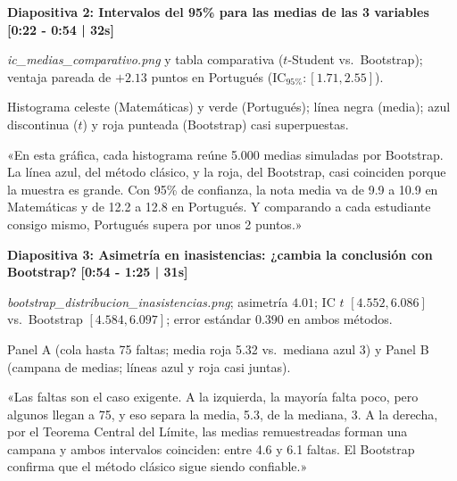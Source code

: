 \documentclass[11pt,a4paper]{article}
\begin{document}
\vspace{0.35cm}

\noindent
\textbf{\large Diapositiva 2: Intervalos del 95\% para las medias de las 3 variables} \hfill \textcolor{timeRed}{\textbf{[0:22 - 0:54 | 32s]}}
\begin{description}[noitemsep,topsep=2pt]
  \item[Visual en Pantalla:] \textit{ic\_medias\_comparativo.png} y tabla comparativa ($t$-Student vs.\ Bootstrap); ventaja pareada de $+2.13$ puntos en Portugués ($\text{IC}_{95\%}: [1.71, 2.55]$).
  \item[Señalar:] Histograma celeste (Matemáticas) y verde (Portugués); línea negra (media); azul discontinua ($t$) y roja punteada (Bootstrap) casi superpuestas.
  \item[Guion de Voz (63 palabras):]
    «En esta gráfica, cada histograma reúne 5.000 medias simuladas por Bootstrap. La línea azul, del método clásico, y la roja, del Bootstrap, casi coinciden porque la muestra es grande. Con 95\% de confianza, la nota media va de 9.9 a 10.9 en Matemáticas y de 12.2 a 12.8 en Portugués. Y comparando a cada estudiante consigo mismo, Portugués supera por unos 2 puntos.»
\end{description}

\vspace{0.35cm}

\noindent
\textbf{\large Diapositiva 3: Asimetría en inasistencias: ¿cambia la conclusión con Bootstrap?} \hfill \textcolor{timeRed}{\textbf{[0:54 - 1:25 | 31s]}}
\begin{description}[noitemsep,topsep=2pt]
  \item[Visual en Pantalla:] \textit{bootstrap\_distribucion\_inasistencias.png}; asimetría $4.01$; IC $t$ $[4.552, 6.086]$ vs.\ Bootstrap $[4.584, 6.097]$; error estándar $0.390$ en ambos métodos.
  \item[Señalar:] Panel A (cola hasta 75 faltas; media roja 5.32 vs.\ mediana azul 3) y Panel B (campana de medias; líneas azul y roja casi juntas).
  \item[Guion de Voz (62 palabras):]
    «Las faltas son el caso exigente. A la izquierda, la mayoría falta poco, pero algunos llegan a 75, y eso separa la media, 5.3, de la mediana, 3. A la derecha, por el Teorema Central del Límite, las medias remuestreadas forman una campana y ambos intervalos coinciden: entre 4.6 y 6.1 faltas. El Bootstrap confirma que el método clásico sigue siendo confiable.»
\end{description}
\end{document}
